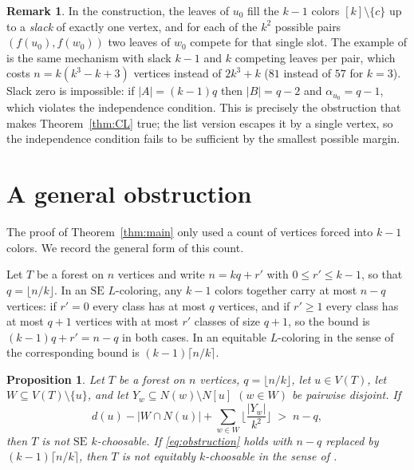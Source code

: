 \documentclass[11pt]{article}
\newtheorem{proposition}[theorem]{Proposition}
\theoremstyle{definition}
\newtheorem{remark}[theorem]{Remark}
\newcommand{\SE}{\mathrm{SE}}
\begin{document}
\begin{remark}\label{rem:KMW}
In the construction, the leaves of $u_0$ fill the $k-1$ colors $[k]\setminus\{c\}$ up to a
\emph{slack} of exactly one vertex, and for each of the $k^2$ possible pairs
$(f(u_0),f(w_0))$ two leaves of $w_0$ compete for that single slot. The example of
\cite[Proposition~22]{KMW} is the same mechanism with slack $k-1$ and $k$ competing
leaves per pair, which costs $n=k(k^3-k+3)$ vertices instead of $2k^3+k$
($81$ instead of $57$ for $k=3$). Slack zero is impossible: if $|A|=(k-1)q$ then
$|B|=q-2$ and $\alpha_{u_0}=q-1$, which violates the independence condition. This is
precisely the obstruction that makes Theorem~\ref{thm:CL} true; the list version escapes
it by a single vertex, so the independence condition fails to be sufficient by the
smallest possible margin.
\end{remark}

\section{A general obstruction}\label{sec:general}

The proof of Theorem~\ref{thm:main} only used a count of vertices forced into $k-1$
colors. We record the general form of this count.

Let $T$ be a forest on $n$ vertices and write $n=kq+r'$ with $0\le r'\le k-1$, so that
$q=\lfloor n/k\rfloor$. In an $\SE$ $L$-coloring, any $k-1$ colors together carry at most
$n-q$ vertices: if $r'=0$ every class has at most $q$ vertices, and if $r'\ge 1$ every
class has at most $q+1$ vertices with at most $r'$ classes of size $q+1$, so the bound is
$(k-1)q+r'=n-q$ in both cases. In an equitable $L$-coloring in the sense of \cite{KPW}
the corresponding bound is $(k-1)\lceil n/k\rceil$.

\begin{proposition}\label{prop:obstruction}
Let $T$ be a forest on $n$ vertices, $q=\lfloor n/k\rfloor$, let $u\in V(T)$, let
$W\subseteq V(T)\setminus\{u\}$, and let $Y_w\subseteq N(w)\setminus N[u]$ $(w\in W)$ be
pairwise disjoint. If
\begin{equation}\label{eq:obstruction}
d(u)-|W\cap N(u)|+\sum_{w\in W}\Big\lfloor \frac{|Y_w|}{k^2}\Big\rfloor \;>\; n-q ,
\end{equation}
then $T$ is not $\SE$ $k$-choosable. If \eqref{eq:obstruction} holds with $n-q$ replaced
by $(k-1)\lceil n/k\rceil$, then $T$ is not equitably $k$-choosable in the sense of
\cite{KPW}.
\end{proposition}
\end{document}
